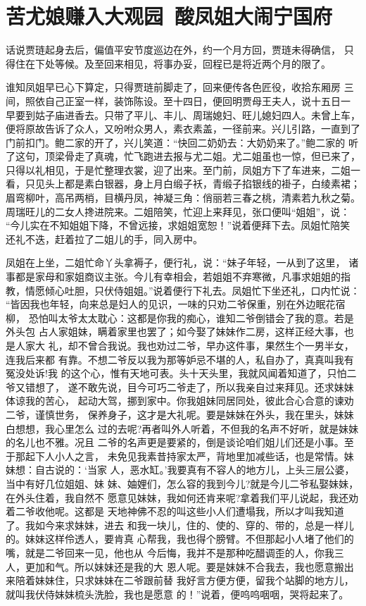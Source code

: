 \chapter{苦尤娘赚入大观园~酸凤姐大闹宁国府}

话说贾琏起身去后，偏值平安节度巡边在外，约一个月方回，贾琏未得确信，
只得住在下处等候。及至回来相见，将事办妥，回程已是将近两个月的限了。

谁知凤姐早已心下算定，只得贾琏前脚走了，回来便传各色匠役，收拾东厢房
三间，照依自己正室一样，装饰陈设。至十四日，便回明贾母王夫人，说十五日一
早要到姑子庙进香去。只带了平儿、丰儿、周瑞媳妇、旺儿媳妇四人。未曾上车，
便将原故告诉了众人，又吩咐众男人，素衣素盖，一径前来。兴儿引路，一直到了
门前扣门。鲍二家的开了，兴儿笑道：“快回二奶奶去：大奶奶来了。”鲍二家的
听了这句，顶梁骨走了真魂，忙飞跑进去报与尤二姐。尤二姐虽也一惊，但已来了，
只得以礼相见，于是忙整理衣裳，迎了出来。至门前，凤姐方下了车进来，二姐一
看，只见头上都是素白银器，身上月白缎子袄，青缎子掐银线的褂子，白绫素裙；
眉弯柳叶，高吊两梢，目横丹凤，神凝三角：俏丽若三春之桃，清素若九秋之菊。
周瑞旺儿的二女人搀进院来。二姐陪笑，忙迎上来拜见，张口便叫“姐姐”，说：
“今儿实在不知姐姐下降，不曾远接，求姐姐宽恕！”说着便拜下去。凤姐忙陪笑
还礼不迭，赶着拉了二姐儿的手，同入房中。

凤姐在上坐，二姐忙命丫头拿褥子，便行礼，说：“妹子年轻，一从到了这里，
诸事都是家母和家姐商议主张。今儿有幸相会，若姐姐不弃寒微，凡事求姐姐的指
教，情愿倾心吐胆，只伏侍姐姐。”说着便行下礼去。凤姐忙下坐还礼，口内忙说：
“皆因我也年轻，向来总是妇人的见识，一味的只劝二爷保重，别在外边眠花宿柳，
恐怕叫太爷太太耽心：这都是你我的痴心，谁知二爷倒错会了我的意。若是外头包
占人家姐妹，瞒着家里也罢了；如今娶了妹妹作二房，这样正经大事，也是人家大
礼，却不曾合我说。我也劝过二爷，早办这件事，果然生个一男半女，连我后来都
有靠。不想二爷反以我为那等妒忌不堪的人，私自办了，真真叫我有冤没处诉!我
的这个心，惟有天地可表。头十天头里，我就风闻着知道了，只怕二爷又错想了，
遂不敢先说，目今可巧二爷走了，所以我亲自过来拜见。还求妹妹体谅我的苦心，
起动大驾，挪到家中。你我姐妹同居同处，彼此合心合意的谏劝二爷，谨慎世务，
保养身子，这才是大礼呢。要是妹妹在外头，我在里头，妹妹白想想，我心里怎么
过的去呢?再者叫外人听着，不但我的名声不好听，就是妹妹的名儿也不雅。况且
二爷的名声更是要紧的，倒是谈论咱们姐儿们还是小事。至于那起下人小人之言，
未免见我素昔持家太严，背地里加减些话，也是常情。妹妹想：自古说的：‘当家
人，恶水缸。’我要真有不容人的地方儿，上头三层公婆，当中有好几位姐姐、妹
妹、妯娌们，怎么容的我到今儿?就是今儿二爷私娶妹妹，在外头住着，我自然不
愿意见妹妹，我如何还肯来呢?拿着我们平儿说起，我还劝着二爷收他呢。这都是
天地神佛不忍的叫这些小人们遭塌我，所以才叫我知道了。我如今来求妹妹，进去
和我一块儿，住的、使的、穿的、带的，总是一样儿的。妹妹这样伶透人，要肯真
心帮我，我也得个膀臂。不但那起小人堵了他们的嘴，就是二爷回来一见，他也从
今后悔，我并不是那种吃醋调歪的人，你我三人，更加和气。所以妹妹还是我的大
恩人呢。要是妹妹不合我去，我也愿意搬出来陪着妹妹住，只求妹妹在二爷跟前替
我好言方便方便，留我个站脚的地方儿，就叫我伏侍妹妹梳头洗脸，我也是愿意
的！”说着，便呜呜咽咽，哭将起来了。

